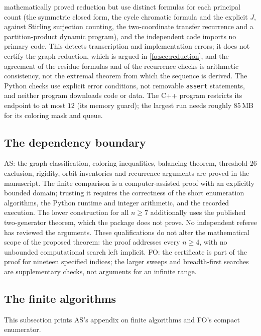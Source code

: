\documentclass[11pt,a4paper]{article}
\numberwithin{equation}{section}
\theoremstyle{definition}
\theoremstyle{remark}
\begin{document}
mathematically proved reduction but use distinct formulas for each principal
count (the symmetric closed form, the cycle chromatic formula and the explicit
$J$, against Stirling surjection counting, the two-coordinate transfer
recurrence and a partition-product dynamic program), and the independent code
imports no primary code. This detects transcription and implementation errors;
it does not certify the graph reduction, which is argued in
\cref{fo:sec:reduction}, and the agreement of the residue formulas and of the
recurrence checks is arithmetic consistency, not the extremal theorem from
which the sequence is derived. The Python checks use explicit error
conditions, not removable \texttt{assert} statements, and neither program
downloads code or data. The C++ program restricts its endpoint to at most $12$
(its memory guard); the largest run needs roughly $85$\,MB for its coloring
mask and queue.

\subsection{The dependency boundary}

AS: the graph classification, coloring inequalities, balancing theorem,
threshold-$26$ exclusion, rigidity, orbit inventories and recurrence arguments
are proved in the manuscript. The finite comparison is a computer-assisted
proof with an explicitly bounded domain; trusting it requires the correctness
of the short enumeration algorithms, the Python runtime and integer
arithmetic, and the recorded execution. The lower construction for all $n\ge7$
additionally uses the published two-generator theorem, which the package does
not prove. No independent referee has reviewed the arguments. These
qualifications do not alter the mathematical scope of the proposed theorem:
the proof addresses every $n\ge4$, with no unbounded computational search left
implicit. FO: the certificate is part of the proof for nineteen specified
indices; the larger sweeps and breadth-first searches are supplementary checks,
not arguments for an infinite range.

\subsection{The finite algorithms}\label{fo:sec:algorithms}

This subsection prints AS's appendix on finite algorithms and FO's compact
enumerator.
\end{document}

